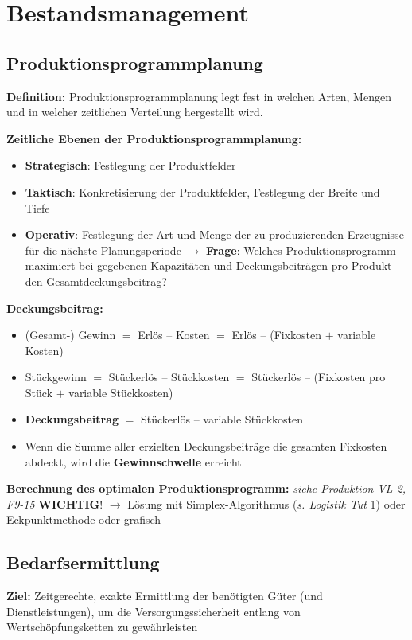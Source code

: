 \section{Bestandsmanagement}

\subsection{Produktionsprogrammplanung}
\textbf{Definition:} Produktionsprogrammplanung legt fest in welchen Arten, Mengen
und in welcher zeitlichen Verteilung hergestellt wird.

\textbf{Zeitliche Ebenen der Produktionsprogrammplanung:}
\begin{itemize}
	\item \textbf{Strategisch}: Festlegung der Produktfelder
	\item \textbf{Taktisch}: Konkretisierung der Produktfelder, Festlegung der Breite und Tiefe
	\item \textbf{Operativ}: Festlegung der Art und Menge der zu produzierenden Erzeugnisse
	für die nächste Planungsperiode $\rightarrow$ \textbf{Frage}: Welches Produktionsprogramm maximiert bei gegebenen Kapazitäten und Deckungsbeiträgen pro Produkt den Gesamtdeckungsbeitrag?
\end{itemize}
\bigskip
\textbf{Deckungsbeitrag:}
\begin{itemize}
	\item (Gesamt-) Gewinn $=$ Erlös $–$ Kosten $=$ Erlös $–$ (Fixkosten $+$ variable Kosten)
	\item Stückgewinn $=$ Stückerlös $–$ Stückkosten $=$ Stückerlös $–$ (Fixkosten pro Stück $+$ variable Stückkosten)
	\item \textbf{Deckungsbeitrag} $=$ Stückerlös $–$ variable Stückkosten
	\item Wenn die Summe aller erzielten Deckungsbeiträge die gesamten Fixkosten abdeckt, wird die \textbf{Gewinnschwelle} erreicht
\end{itemize}
\bigskip
\textbf{Berechnung des optimalen Produktionsprogramm:} \textit{siehe Produktion VL 2, F9-15} \textbf{WICHTIG}! $\rightarrow$ Lösung mit Simplex-Algorithmus (\textit{s. Logistik Tut} 1) oder Eckpunktmethode oder grafisch

\subsection{Bedarfsermittlung}

\textbf{Ziel:} Zeitgerechte, exakte Ermittlung der benötigten Güter (und Dienstleistungen), um die Versorgungssicherheit entlang von Wertschöpfungsketten zu gewährleisten

